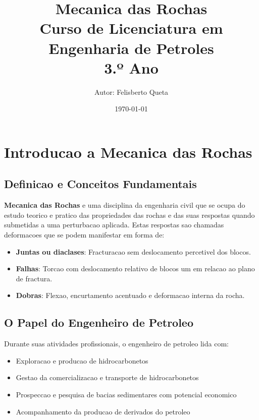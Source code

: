 \documentclass[12pt,a4paper,twoside]{book}
\title{\huge \textbf{Mecanica das Rochas} \\
        \large Curso de Licenciatura em Engenharia de Petroles \\
        \normalsize 3.º Ano}
\author{Autor: Felisberto Queta}
\date{\today}
\begin{document}
\maketitle

\tableofcontents
\newpage

\chapter{Introducao a Mecanica das Rochas}

\section{Definicao e Conceitos Fundamentais}

\textbf{Mecanica das Rochas} e uma disciplina da engenharia civil que se ocupa do estudo teorico 
e pratico das propriedades das rochas e das suas respostas quando submetidas a uma perturbacao 
aplicada. Estas respostas sao chamadas deformacoes que se podem manifestar em forma de:

\begin{itemize}
    \item \textbf{Juntas ou diaclases}: Fracturacao sem deslocamento percetivel dos blocos.
    \item \textbf{Falhas}: Torcao com deslocamento relativo de blocos um em relacao ao plano de fractura.
    \item \textbf{Dobras}: Flexao, encurtamento acentuado e deformacao interna da rocha.
\end{itemize}

\section{O Papel do Engenheiro de Petroleo}

Durante suas atividades profissionais, o engenheiro de petroleo lida com:
\begin{itemize}
    \item Exploracao e producao de hidrocarbonetos
    \item Gestao da comercializacao e transporte de hidrocarbonetos
    \item Prospeccao e pesquisa de bacias sedimentares com potencial economico
    \item Acompanhamento da producao de derivados do petroleo
\end{itemize}
\end{document}
